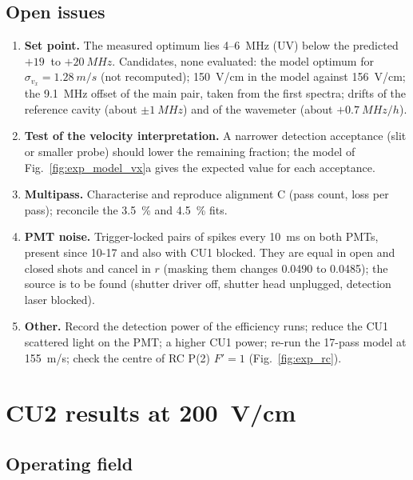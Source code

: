 \documentclass[11pt,a4paper,oneside]{report}
\begin{document}
\section{Open issues}
\label{sec:exp_open}

\begin{enumerate}[itemsep=1pt]
  \item \textbf{Set point.} The measured optimum lies 4--\SI{6}{MHz} (UV) below the predicted
        $+\SI{19}{}$ to $+\SI{20}{MHz}$. Candidates, none evaluated: the model optimum for
        $\sigma_{v_x}=\SI{1.28}{m/s}$ (not recomputed); \SI{150}{V/cm} in the model against \SI{156}{V/cm};
        the \SI{9.1}{MHz} offset of the main pair, taken from the first spectra; drifts of the reference
        cavity (about $\pm\SI{1}{MHz}$) and of the wavemeter (about $+\SI{0.7}{MHz/h}$).
  \item \textbf{Test of the velocity interpretation.} A narrower detection acceptance (slit or smaller
        probe) should lower the remaining fraction; the model of Fig.~\ref{fig:exp_model_vx}a gives the
        expected value for each acceptance.
  \item \textbf{Multipass.} Characterise and reproduce alignment C (pass count, loss per pass);
        reconcile the \SI{3.5}{\percent} and \SI{4.5}{\percent} fits.
  \item \textbf{PMT noise.} Trigger-locked pairs of spikes every \SI{10}{ms} on both PMTs, present since
        10-17 and also with CU1 blocked. They are equal in open and closed shots and cancel in $r$
        (masking them changes 0.0490 to 0.0485); the source is to be found (shutter driver off, shutter
        head unplugged, detection laser blocked).
  \item \textbf{Other.} Record the detection power of the efficiency runs; reduce the CU1 scattered light
        on the PMT; a higher CU1 power; re-run the 17-pass model at \SI{155}{m/s}; check the centre of
        RC P(2) $F'=1$ (Fig.~\ref{fig:exp_rc}).
\end{enumerate}

\chapter{CU2 results at \SI{200}{V/cm}}
\label{ch:j2}

\section{Operating field}
\end{document}
